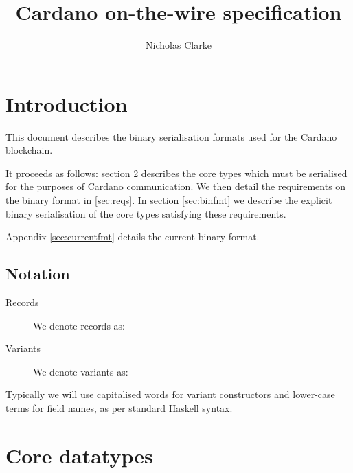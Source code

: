 \documentclass{article}
\title{Cardano on-the-wire specification}
\author{Nicholas Clarke}
\begin{document}
\maketitle
\tableofcontents

\section{Introduction}

This document describes the binary serialisation formats used for the Cardano
blockchain.

It proceeds as follows: section \ref{sec:types} describes the core types which
must be serialised for the purposes of Cardano communication. We then detail the
requirements on the binary format in \ref{sec:reqs}. In section \ref{sec:binfmt}
we describe the explicit binary serialisation of the core types satisfying these
requirements.

Appendix \ref{sec:currentfmt} details the current binary format.

\subsection{Notation}

\begin{description}
  \item[Records] We denote records as:

  \item[Variants] We denote variants as:
\end{description}

Typically we will use capitalised words for variant constructors and lower-case
terms for field names, as per standard Haskell syntax.

\section{Core datatypes}
\label{sec:types}
\end{document}
